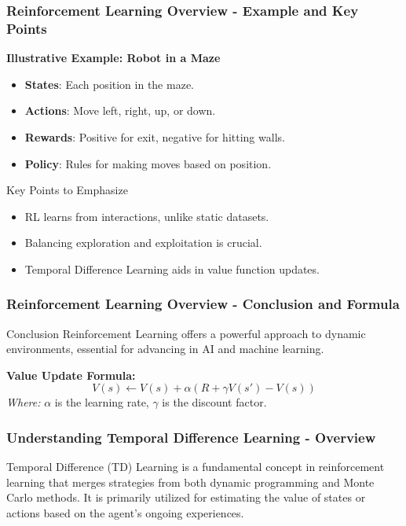 \documentclass[aspectratio=169]{beamer}
\begin{document}
\begin{frame}[fragile]
    \frametitle{Reinforcement Learning Overview - Example and Key Points}
    \textbf{Illustrative Example: Robot in a Maze}
    \begin{itemize}
        \item \textbf{States}: Each position in the maze.
        \item \textbf{Actions}: Move left, right, up, or down.
        \item \textbf{Rewards}: Positive for exit, negative for hitting walls.
        \item \textbf{Policy}: Rules for making moves based on position.
    \end{itemize}
    
    \begin{block}{Key Points to Emphasize}
        \begin{itemize}
            \item RL learns from interactions, unlike static datasets.
            \item Balancing exploration and exploitation is crucial.
            \item Temporal Difference Learning aids in value function updates.
        \end{itemize}
    \end{block}
\end{frame}

\begin{frame}[fragile]
    \frametitle{Reinforcement Learning Overview - Conclusion and Formula}
    \begin{block}{Conclusion}
        Reinforcement Learning offers a powerful approach to dynamic environments, essential for advancing in AI and machine learning.
    \end{block}
    
    \textbf{Value Update Formula:}
    \begin{equation}
        V(s) \leftarrow V(s) + \alpha \left( R + \gamma V(s') - V(s) \right)
    \end{equation}
    \textit{Where:} $ \alpha $ is the learning rate, $ \gamma $ is the discount factor.
\end{frame}

\begin{frame}[fragile]
    \frametitle{Understanding Temporal Difference Learning - Overview}
    Temporal Difference (TD) Learning is a fundamental concept in reinforcement learning that merges strategies from both dynamic programming and Monte Carlo methods. 
    It is primarily utilized for estimating the value of states or actions based on the agent's ongoing experiences.
\end{frame}
\end{document}
